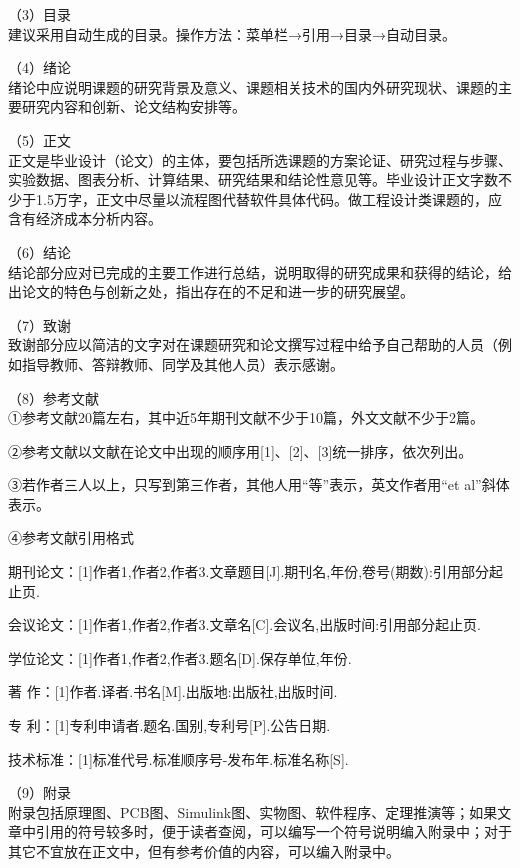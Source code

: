 \documentclass[UTF8,zihao=-4,openany,oneside]{ctexbook}
\begin{document}
\noindent （3）目录\\

建议采用自动生成的目录。操作方法：菜单栏→引用→目录→自动目录。

\noindent （4）绪论\\

绪论中应说明课题的研究背景及意义、课题相关技术的国内外研究现状、课题的主要研究内容和创新、论文结构安排等。

\noindent （5）正文\\

正文是毕业设计（论文）的主体，要包括所选课题的方案论证、研究过程与步骤、实验数据、图表分析、计算结果、研究结果和结论性意见等。毕业设计正文字数不少于1.5万字，正文中尽量以流程图代替软件具体代码。做工程设计类课题的，应含有经济成本分析内容。

\noindent （6）结论\\

结论部分应对已完成的主要工作进行总结，说明取得的研究成果和获得的结论，给出论文的特色与创新之处，指出存在的不足和进一步的研究展望。

\noindent （7）致谢\\

致谢部分应以简洁的文字对在课题研究和论文撰写过程中给予自己帮助的人员（例如指导教师、答辩教师、同学及其他人员）表示感谢。

\noindent （8）参考文献\\

①参考文献20篇左右，其中近5年期刊文献不少于10篇，外文文献不少于2篇。

②参考文献以文献在论文中出现的顺序用[1]、[2]、[3]统一排序，依次列出。

③若作者三人以上，只写到第三作者，其他人用“等”表示，英文作者用“et al”斜体表示。

④参考文献引用格式

期刊论文：[1]作者1,作者2,作者3.文章题目[J].期刊名,年份,卷号(期数):引用部分起止页.

会议论文：[1]作者1,作者2,作者3.文章名[C].会议名,出版时间:引用部分起止页.

学位论文：[1]作者1,作者2,作者3.题名[D].保存单位,年份.

著 作：[1]作者.译者.书名[M].出版地:出版社,出版时间.

专 利：[1]专利申请者.题名.国别,专利号[P].公告日期.

技术标准：[1]标准代号.标准顺序号-发布年.标准名称[S].

\noindent （9）附录\\

附录包括原理图、PCB图、Simulink图、实物图、软件程序、定理推演等；如果文章中引用的符号较多时，便于读者查阅，可以编写一个符号说明编入附录中；对于其它不宜放在正文中，但有参考价值的内容，可以编入附录中。
\end{document}

